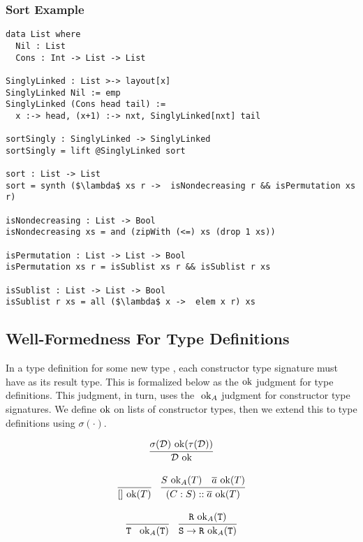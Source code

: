 \documentclass[10pt]{article}
\begin{document}
\subsubsection{Sort Example}

\begin{lstlisting}
data List where
  Nil : List
  Cons : Int -> List -> List

SinglyLinked : List >-> layout[x]
SinglyLinked Nil := emp
SinglyLinked (Cons head tail) :=
  x :-> head, (x+1) :-> nxt, SinglyLinked[nxt] tail

sortSingly : SinglyLinked -> SinglyLinked
sortSingly = lift @SinglyLinked sort

sort : List -> List
sort = synth ($\lambda$ xs r ->  isNondecreasing r && isPermutation xs r)

isNondecreasing : List -> Bool
isNondecreasing xs = and (zipWith (<=) xs (drop 1 xs))

isPermutation : List -> List -> Bool
isPermutation xs r = isSublist xs r && isSublist r xs

isSublist : List -> List -> Bool
isSublist r xs = all ($\lambda$ x ->  elem x r) xs
\end{lstlisting}



\subsection{Well-Formedness For Type Definitions}

In a type definition for some new type , each constructor type signature must have  as its result type. This is
formalized below as the$\textnormal{ ok}$ judgment for type definitions. This judgment, in turn, uses the $\textnormal{ ok}_A$ judgment for constructor
type signatures. We define$\textnormal{ ok}$ on lists of constructor types, then we extend this to type definitions using $\sigma(\cdot)$.

\[
  \begin{array}{c}
    \infer{\mathcal{D} \ok}{\sigma(\mathcal{D}) \ok(\tau(\mathcal{D}))}
    \\\\

    \infer{[] \ok(T)}{}
    ~~~
    \infer{(C : S) :: \overline{a} \ok(T)}{S \ok_A(T) & \overline{a} \ok(T) }
    \\\\
    \infer{\ttt{T }\ok_A(\ttt{T})}{}
    ~~~
    \infer{\ttt{S} \ra \ttt{R} \ok_A(\ttt{T})}{\ttt{R} \ok_A(\ttt{T})}
  \end{array}
\]
\end{document}
